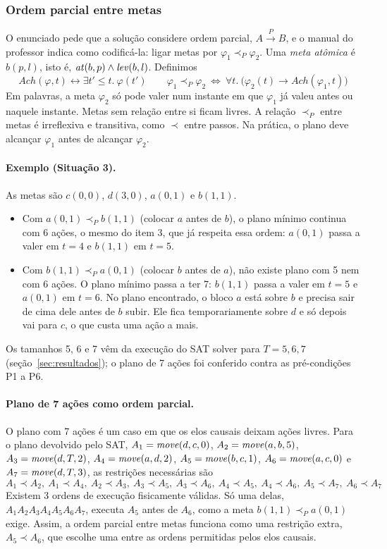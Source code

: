\subsubsection{Ordem parcial entre metas}

O enunciado pede que a solução considere ordem parcial, $A\xrightarrow{P}B$, e o manual do professor indica como codificá-la: ligar metas por $\varphi_1\prec_P\varphi_2$. Uma \emph{meta atômica} é $b(p,l)$, isto é, $\mathit{at}(b,p)\land\mathit{lev}(b,l)$. Definimos
\[
\mathit{Ach}(\varphi,t)\leftrightarrow\exists t'\le t.\ \varphi(t')
\qquad
\varphi_1\prec_P\varphi_2\ \Longleftrightarrow\ \forall t.\ \bigl(\varphi_2(t)\rightarrow\mathit{Ach}(\varphi_1,t)\bigr)
\]
Em palavras, a meta $\varphi_2$ só pode valer num instante em que $\varphi_1$ já valeu antes ou naquele instante. Metas sem relação entre si ficam livres. A relação $\prec_P$ entre metas é irreflexiva e transitiva, como $\prec$ entre passos. Na prática, o plano deve alcançar $\varphi_1$ antes de alcançar $\varphi_2$.

\paragraph{Exemplo (Situação 3).} As metas são $c(0,0)$, $d(3,0)$, $a(0,1)$ e $b(1,1)$.
\begin{itemize}
\item Com $a(0,1)\prec_P b(1,1)$ (colocar $a$ antes de $b$), o plano mínimo continua com 6 ações, o mesmo do item 3, que já respeita essa ordem: $a(0,1)$ passa a valer em $t=4$ e $b(1,1)$ em $t=5$.
\item Com $b(1,1)\prec_P a(0,1)$ (colocar $b$ antes de $a$), não existe plano com 5 nem com 6 ações. O plano mínimo passa a ter 7: $b(1,1)$ passa a valer em $t=5$ e $a(0,1)$ em $t=6$. No plano encontrado, o bloco $a$ está sobre $b$ e precisa sair de cima dele antes de $b$ subir. Ele fica temporariamente sobre $d$ e só depois vai para $c$, o que custa uma ação a mais.
\end{itemize}
Os tamanhos 5, 6 e 7 vêm da execução do SAT solver para $T=5,6,7$ (seção~\ref{sec:resultados}); o plano de 7 ações foi conferido contra as pré-condições P1 a P6.

\paragraph{Plano de 7 ações como ordem parcial.} O plano com 7 ações é um caso em que os elos causais deixam ações livres. Para o plano devolvido pelo SAT, $A_1=\mathit{move}(d,c,0)$, $A_2=\mathit{move}(a,b,5)$, $A_3=\mathit{move}(d,T,2)$, $A_4=\mathit{move}(a,d,2)$, $A_5=\mathit{move}(b,c,1)$, $A_6=\mathit{move}(a,c,0)$ e $A_7=\mathit{move}(d,T,3)$, as restrições necessárias são
\[
A_1\prec A_2,\ A_1\prec A_4,\ A_2\prec A_3,\ A_3\prec A_5,\ A_3\prec A_6,\ A_4\prec A_5,\ A_4\prec A_6,\ A_5\prec A_7,\ A_6\prec A_7
\]
Existem 3 ordens de execução fisicamente válidas. Só uma delas, $A_1A_2A_3A_4A_5A_6A_7$, executa $A_5$ antes de $A_6$, como a meta $b(1,1)\prec_P a(0,1)$ exige. Assim, a ordem parcial entre metas funciona como uma restrição extra, $A_5\prec A_6$, que escolhe uma entre as ordens permitidas pelos elos causais.
